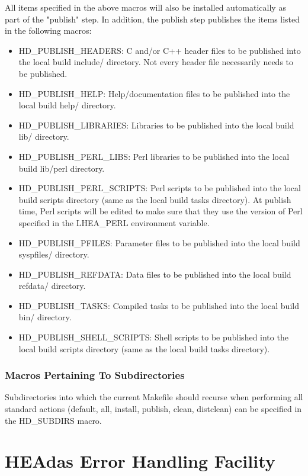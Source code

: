 \documentclass[11pt]{book}
\begin{document}
All items specified in the above macros will also be
installed automatically as part of the "publish" step. In
addition, the publish step publishes the items listed in
the following macros:

\begin{itemize}
\item HD\_PUBLISH\_HEADERS: C and/or C++ header files to
be published into the local build include/ directory. Not
every header file necessarily needs to be published.
\item HD\_PUBLISH\_HELP: Help/documentation files to
be published into the local build help/ directory.
\item HD\_PUBLISH\_LIBRARIES: Libraries to be published
into the local build lib/ directory.
\item HD\_PUBLISH\_PERL\_LIBS: Perl libraries to be published
into the local build lib/perl directory.
\item HD\_PUBLISH\_PERL\_SCRIPTS: Perl scripts to be published
into the local build scripts directory (same as the local build
tasks directory). At publish
time, Perl scripts will be edited to make sure that they use
the version of Perl specified in the LHEA\_PERL environment
variable.
\item HD\_PUBLISH\_PFILES: Parameter files to be published
into the local build syspfiles/ directory.
\item HD\_PUBLISH\_REFDATA: Data files to be published
into the local build refdata/ directory.
\item HD\_PUBLISH\_TASKS: Compiled tasks to be published
into the local build bin/ directory.
\item HD\_PUBLISH\_SHELL\_SCRIPTS: Shell scripts to be published
into the local build scripts directory (same as the local build
tasks directory).
\end{itemize}

\subsection{Macros Pertaining To Subdirectories}
Subdirectories into which the current Makefile should recurse
when performing all standard actions (default, all, install,
publish, clean, distclean) can be specified in
the HD\_SUBDIRS macro.

\chapter{HEAdas Error Handling Facility}
\end{document}
